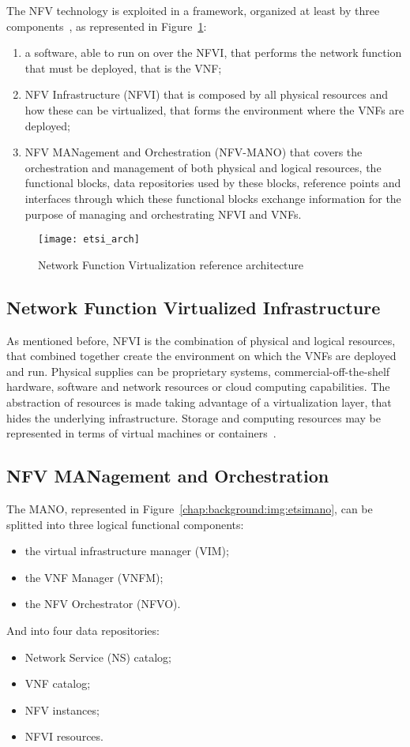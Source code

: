 The NFV technology is exploited in a framework, organized
at least by three components~\cite{etsi2013gs}, as represented in
Figure~\ref{chap:background:img:etsi_arch}:
\begin{enumerate}
  \item a software, able to run on over the NFVI, that performs the network
  function that must be deployed, that is the VNF;
  \item NFV Infrastructure (NFVI) that is composed by all physical resources
  and how these can be virtualized, that forms the environment where the VNFs
  are deployed;
  \item NFV MANagement and Orchestration (NFV-MANO) that covers the
  orchestration and management of both physical and logical resources, the
  functional blocks, data repositories used by these blocks, reference points
  and interfaces through which these functional blocks exchange
  information for the purpose of managing and orchestrating NFVI and VNFs.
\end{enumerate}

\begin{figure}
  \centering
  \texttt{[image: etsi\_arch]}
  \caption{Network Function Virtualization reference
  architecture~\cite{etsi2013gs}}
  \label{chap:background:img:etsi_arch}
\end{figure}

\subsection{Network Function Virtualized Infrastructure}
As mentioned before, NFVI is the combination of physical and logical resources,
that combined together create the environment on which the VNFs are deployed
and run. Physical supplies can be proprietary systems, commercial-off-the-shelf
hardware, software and network resources or cloud computing capabilities. The
abstraction of resources is made taking advantage of a virtualization layer,
that hides the underlying infrastructure. Storage and computing resources may
be represented in terms of virtual machines or
containers~\cite{mijumbi2016network}.

\subsection{NFV MANagement and Orchestration}
The MANO, represented in Figure~\ref{chap:background:img:etsimano}, can be
splitted into three logical functional components:
\begin{itemize}
  \item the virtual infrastructure manager (VIM);
  \item the VNF Manager (VNFM);
  \item the NFV Orchestrator (NFVO).
\end{itemize}
And into four data repositories:
\begin{itemize}
  \item Network Service (NS) catalog;
  \item VNF catalog;
  \item NFV instances;
  \item NFVI resources.
\end{itemize}

